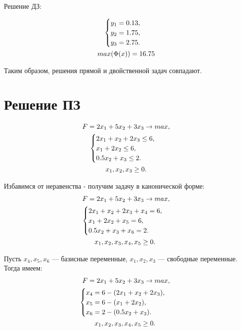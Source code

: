 \documentclass[12pt,a4paper,oneside]{extarticle}
\begin{document}
    Решение ДЗ:

    \begin{gather}
        \begin{cases}
            y_1 = 0.13,\\
            y_2 = 1.75, \\
            y_3 = 2.75. \\
        \end{cases} \notag \\
        max (\Phi(x)) = 16.75 \notag 
    \end{gather}

    Таким образом, решения прямой и двойственной задач совпадают.

\clearpage

\section{Решение ПЗ}
    \label{sec:pz}
    \begin{gather}
        F = 2x_1+5x_2+3x_3 \rightarrow max,  \notag  \\
        \begin{cases}
            2x_1 + x_2 + 2x_3 \leq 6, \\
            x_1 + 2x_2 \leq 6, \\
            0.5x_2 + x_3 \leq 2.
        \end{cases} \notag \\
        x_1, x_2, x_3 \geq 0. \notag
    \end{gather} 

    Избавимся от неравенства - получим задачу в канонической форме:
    \begin{gather}
        F = 2x_1+5x_2+3x_3 \rightarrow max,  \notag  \\
        \begin{cases}
            2x_1 + x_2 + 2x_3 + x_4 = 6, \\
            x_1 + 2x_2 + x_5 = 6, \\
            0.5x_2 + x_3 + x_6 = 2.
        \end{cases} 
        \notag \\ x_1, x_2, x_3, x_4, x_5 \geq 0. \
    \end{gather} 

    Пусть $x_4,x_5,x_6$ --- базисные переменные, $x_1,x_2,x_3$ --- свободные переменные. Тогда имеем:
    \begin{gather}
        F = 2x_1+5x_2+3x_3 \rightarrow max,  \notag  \\
        \begin{cases}
            x_4 = 6 - (2x_1 + x_2 + 2x_3), \\
            x_5 = 6 - (x_1 + 2x_2),\\
            x_6 = 2 - (0.5x_2 + x_3).
        \end{cases} 
        \notag \\ x_1, x_2, x_3, x_4, x_5 \geq 0. \
    \end{gather} 
\end{document}
